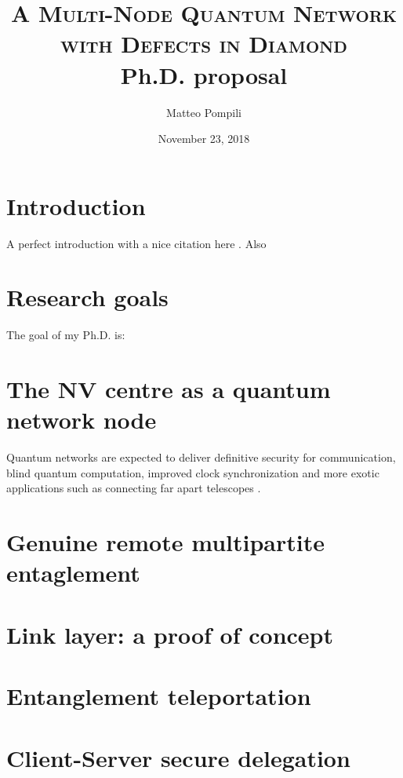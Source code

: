 \documentclass[a4paper]{article}
\title{
	\huge{\textsc{A Multi-Node Quantum Network\\with Defects in Diamond}}\\
	\vspace{10pt}\Large{Ph.D. proposal}
}
\author{Matteo Pompili}
\date{November 23, 2018}
\begin{document}
\maketitle

\section*{Introduction}
A perfect introduction with a nice citation here \cite{Humphreys2018}.
Also \blindtext


\tableofcontents

\section{Research goals}
The goal of my Ph.D. is:\\
\par
{}




\section{The NV centre as a quantum network node}

Quantum networks are expected to deliver definitive security for communication, blind quantum computation, improved clock synchronization and more exotic applications such as connecting far apart telescopes \cite{Wehner2018}.

\section{Genuine remote multipartite entaglement}

\section{Link layer: a proof of concept}

\section{Entanglement teleportation}

\section{Client-Server secure delegation}
\end{document}
